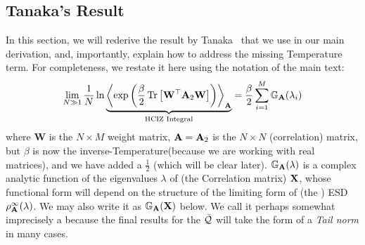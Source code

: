 \subsection{Tanaka's Result}
\label{sxn:tanaka}

In this section, we will rederive the result by Tanaka~\cite{Tanaka2007,Tanaka2008} that we use in our main derivation,
and, importantly, explain how to address the missing Temperature term.
For completeness, we restate it here using the notation of the main text:
\begin{equation}
  \label{eqn:hciz}
  \lim_{N \gg 1} \frac{1}{N} \ln 
\underbrace{
  \Expected[\mathbf{\AMAT}]{
    \exp\left(\frac{\beta}{2}
    \Trace{\mathbf{W}^{\top} \AMAT_{2} \mathbf{W}}
    \right)
  }
 }_{\text{HCIZ Integral}}
  = \frac{\beta}{2} \sum_{i=1}^{M} \GNORM(\lambda_{i})
\end{equation}
where 
$\mathbf{W}$ is the $N\times M$ \Teacher weight matrix, 
$\mathbf{A}=\mathbf{A}_{2}$ is the $N\times N$ \Student (correlation) matrix, 
but $\beta$ is now the inverse-Temperature(because we are working with real matrices),
and we have added a $\tfrac{1}{2}$ (which will be clear later).
$\mathbb{G}_{\mathbf{A}}(\lambda)$ is a complex analytic function of the eigenvalues $\lambda$ of (the \Teacher Correlation matrix) $\mathbf{X}$, 
whose functional form will depend on the structure of the limiting form of (the \Student) ESD $\rho_{\mathbf{A}}^{\infty}(\lambda)$.
We may also write it as $\mathbb{G}_{\mathbf{A}}(\mathbf{X})$ below.
We call it perhaps somewhat imprecisely a  \emph{\GEN} because the final results for the \LayerQuality  $\bar{\mathcal{Q}}$ will take the form of a \emph{Tail norm} in many cases.


